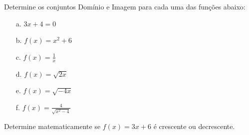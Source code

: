 \begin{exercise}
	Determine os conjuntos Domínio e Imagem para cada uma das funções abaixo:
	\begin{itemize}
		\item[a.]{$3x+4=0$}
		\item[b.]{$f(x) = x^2 + 6$}
		\item[c.]{$f(x) = \frac{1}{x}$}
		\item[d.]{$f(x) = \sqrt{2x}$}
		\item[e.]{$f(x) = \sqrt{-4x}$}
		\item[f.]{$f(x) = \frac{4}{\sqrt{x^2-4}}$}
	\end{itemize}
\end{exercise}

\begin{exercise}
	Determine matematicamente se $f(x) = 3x + 6$ é crescente ou decrescente.
\end{exercise}